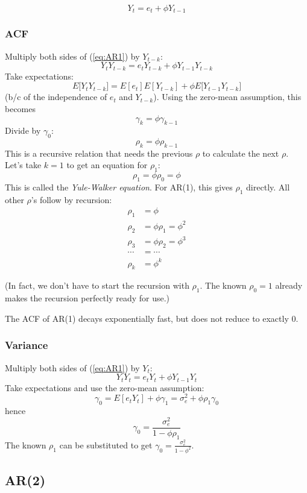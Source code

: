 \documentclass[12pt]{article}
\begin{document}
\begin{equation}\label{eq:AR1}
Y_t = e_t + \phi Y_{t-1}
\end{equation}

\subsubsection{ACF}

Multiply both sides of (\ref{eq:AR1}) by $Y_{t-k}$:
\[
Y_t Y_{t-k} = e_t Y_{t-k} + \phi Y_{t-1} Y_{t-k}
\]
Take expectations:
\[
E\bigl[Y_t Y_{t-k}\bigr]
= E[e_t] E[Y_{t-k}] + \phi E\bigl[Y_{t-1} Y_{t-k}\bigr]
\]
(b/c of the independence of $e_t$ and $Y_{t-k}$).
Using the zero-mean assumption, this becomes
\[
\gamma_k = \phi \gamma_{k-1}
\]
Divide by $\gamma_0$:
\[
\rho_k = \phi \rho_{k-1}
\]
This is a recursive relation that needs the previous $\rho$
to calculate the next $\rho$.
Let's take $k=1$ to get an equation for $\rho_1$:
\[
\rho_1 = \phi \rho_0 = \phi
\]
This is called the \emph{Yule-Walker equation}.
For AR(1), this gives $\rho_1$ directly.
All other $\rho$'s follow by recursion:
\begin{align*}
\rho_1 &= \phi\\
\rho_2 &= \phi \rho_1 = \phi^2\\
\rho_3 &= \phi \rho_2 = \phi^3\\
\dotsb &= \dotsb\\
\rho_k &= \phi^k
\end{align*}

(In fact, we don't have to start the recursion with $\rho_1$.
The known $\rho_0 = 1$ already makes the recursion perfectly ready for use.)

\alert
The ACF of AR(1) decays exponentially fast,
but does not reduce to exactly 0.

\subsubsection{Variance}

Multiply both sides of (\ref{eq:AR1}) by $Y_t$:
\[
Y_t Y_t = e_t Y_t + \phi Y_{t-1} Y_t
\]
Take expectations and use the zero-mean assumption:
\[
\gamma_0
= E[e_t Y_t] + \phi \gamma_1
= \sigma_e^2 + \phi \rho_1 \gamma_0
\]
hence
\[
\gamma_0 = \frac{\sigma_e^2}{1 - \phi \rho_1}
\]
The known $\rho_1$ can be substituted to get
$
\gamma_0 = \frac{\sigma_e^2}{1 - \phi^2}
$.

\subsection{AR(2)}
\end{document}
